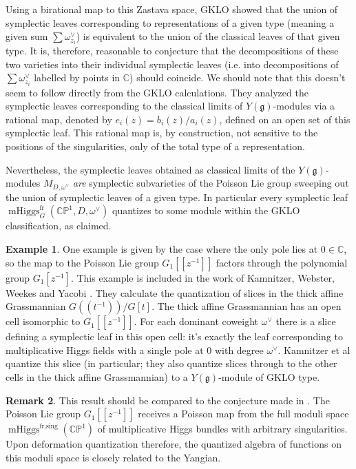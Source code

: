 \documentclass[11pt, oneside, reqno]{amsart}
\theoremstyle{definition} \newtheorem{definition}{Definition}[section]
\theoremstyle{definition} \newtheorem{remark}[definition]{Remark}
\theoremstyle{definition} \newtheorem{remarks}[definition]{Remarks}
\theoremstyle{definition} \newtheorem{question}[definition]{Question}
\theoremstyle{definition} \newtheorem*{note}{Note}
\theoremstyle{definition} \newtheorem{example}[definition]{Example}
\theoremstyle{definition} \newtheorem{examples}[definition]{Examples}
\renewcommand{\gg}{\mathfrak{g}}
\newcommand{\bb}[1]{\mathbb{#1}}
\newcommand{\CC}{\mathbb{C}}
\DeclareMathOperator{\mhiggs}{mHiggs}
\newcommand{\fr}{\mathrm{fr}}
\begin{document}
Using a birational map to this Zastava space, GKLO showed that the union of symplectic leaves corresponding to representations of a given type (meaning a given sum $\sum \omega^\vee_{z_i}$) is equivalent to the union of the classical leaves of that given type.  It is, therefore, reasonable to conjecture that the decompositions of these two varieties into their individual symplectic leaves (i.e. into decompositions of $\sum \omega^\vee_{z_i}$ labelled by points in $\CC$) should coincide.  We should note that this doesn't seem to follow directly from the GKLO calculations.  They analyzed the symplectic leaves corresponding to the classical limits of $Y(\gg)$-modules via a rational map, denoted by $e_i(z) = b_i(z)/a_i(z)$, defined on an open set of this symplectic leaf.  This rational map is, by construction, not sensitive to the positions of the singularities, only of the total type of a representation.

Nevertheless, the symplectic leaves obtained as classical limits of the $Y(\gg)$-modules $M_{D,\omega^\vee}$ \emph{are} symplectic subvarieties of the Poisson Lie group sweeping out the union of symplectic leaves of a given type.  In particular every symplectic leaf $\mhiggs^\fr_G(\bb{CP}^1,D,\omega^\vee)$ quantizes to some module within the GKLO classification, as claimed.

\begin{example}
One example is given by the case where the only pole lies at $0 \in \CC$, so the map to the Poisson Lie group $G_1[[z^{-1}]]$ factors through the polynomial group $G_1[z^{-1}]$.  This example is included in the work of Kamnitzer, Webster, Weekes and Yacobi \cite{KWWY}.  They calculate the quantization of slices in the thick affine Grassmannian $G(\!(t^{-1})\!)/G[t]$.  The thick affine Grassmannian has an open cell isomorphic to $G_1[[z^{-1}]]$.  For each dominant coweight $\omega^\vee$ there is a slice defining a symplectic leaf in this open cell: it's exactly the leaf corresponding to multiplicative Higgs fields with a single pole at 0 with degree $\omega^\vee$.  Kamnitzer et al quantize this slice (in particular; they also quantize slices through to the other cells in the thick affine Grassmannian) to a $Y(\gg)$-module of GKLO type. 
\end{example}

\begin{remark}
This result should be compared to the conjecture made in \cite[Chapter 8.1]{NekrasovPestun}.  The Poisson Lie group $G_1[[z^{-1}]]$ receives a Poisson map from the full moduli space $\mhiggs^{\text{fr,sing}}(\bb{CP}^1)$ of multiplicative Higgs bundles with arbitrary singularities.  Upon deformation quantization therefore, the quantized algebra of functions on this moduli space is closely related to the Yangian.
\end{remark}
\end{document}
